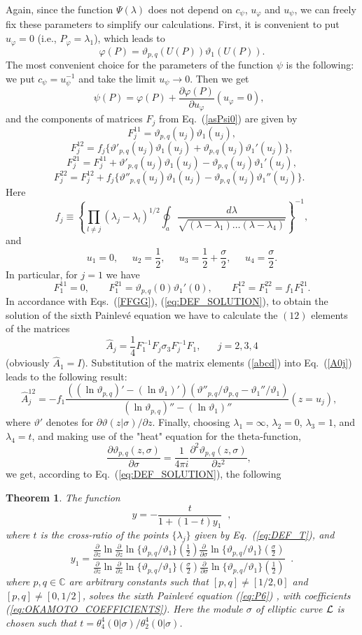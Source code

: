 \documentclass[11pt]{article}
\newtheorem{theorem}{Theorem}[section]
\def\be{\begin{equation}}
\def\ee{\end{equation}}
\def\ben{\begin{displaymath}}
\def\een{\end{displaymath}}
\def\l{\lambda}
\def\th{\vartheta}
\def\phi{\varphi}
\def\C{\mathbb{C}}
\def\la{\label}
\def\f{\frac}
\def\L{{\cal L}}
\def\p{\partial}
\def\log{\ln}
\begin{document}
Again, since the function $\Psi(\l)$ does not depend on $c_\psi$, $u_\phi$ and $u_\psi$, we can freely fix these parameters to simplify our calculations.
First, it is convenient to put $u_\phi=0$ (i.e., $P_\phi=\l_1$), which leads to
\be
\phi(P)=\th_{p,q}(U(P))\th_1(U(P)).
\ee
The most convenient choice for the parameters of the function $\psi$ is the following: we put $c_\psi=u_\psi^{-1}$ and take the limit $u_\psi\rightarrow 0$. Then we get  
\be
\psi(P)= \phi(P)+ \f{\p\phi(P)}{\p u_\phi}(u_\phi=0),\;\;
\la{psin}\ee
and the components of matrices $F_j$ from Eq.~(\ref{asPsi0}) are given by
\ben
F^{11}_j=\th_{p,q}(u_j)\th_1(u_j),
\een
\ben
F^{12}_j= f_j\{\th'_{p,q}(u_j)\th_1(u_j)+\th_{p,q}(u_j)\th_1'(u_j)\}, 
\een
\ben
F^{21}_j=F^{11}_j+\th'_{p,q}(u_j)\th_1(u_j)-\th_{p,q}(u_j)\th_1'(u_j),  
\een
\be
F^{22}_j=F^{12}_j+f_j\{\th''_{p,q}(u_j)\th_1(u_j)-\th_{p,q}(u_j)\th_1''(u_j)\}.\;\;
\la{abcd}
\ee
Here
\be
f_j\equiv
\left\{\prod_{l\neq j} (\l_j-\l_l)^{1/2}\oint_a\f{d\l}{\sqrt{(\l-\l_1)\dots (\l-\l_4)}}\right\}^{-1},
\la{Fj}\ee
and 
\be
u_1=0,\;\;\;\;\; u_2=\f{1}{2},\;\;\;\;\; u_3=\f{1}{2}+\f{\sigma}{2},\;\;\;\;\;
u_4=\f{\sigma}{2}.
\la{Uj1}\ee
In particular, for $j=1$ we have
\be
F^{11}_1=0,\;\;\;\;\;\;\;
F^{21}_1=\th_{p,q}(0)\th_1'(0),\;\;\;\;\;\;\;
F^{12}_1=F^{22}_1 =f_1 F^{21}_1.
\ee
In accordance with Eqs.~(\ref{FFGG}), (\ref{eq:DEF_SOLUTION}), to obtain the solution of the 
sixth Painlev\'{e} equation we have to calculate the $(12)$ elements of the matrices 
\be
\hat{A}_j= \f{1}{4}F_1^{-1}F_j\sigma_3 F_j^{-1} F_1,\;\;\;\;\;\; j=2,3,4
\la{A0j}\ee
(obviously $\hat{A}_1=I$). Substitution of the matrix elements (\ref{abcd})  into Eq.~(\ref{A0j}) 
leads to the following result:
\be
\hat{A}^{12}_j = -f_1
\f{((\log\th_{p,q})'-(\log\th_1)')
({\th''_{p,q}}/{\th_{p,q}}-{\th_1''}/{\th_1})}{(\log\th_{p,q})''-
(\log\th_1)''}(z=u_j),\;\;
\la{A12final}
\ee
where $\th'$ denotes for $\p\th(z|\sigma)/\p z$.
Finally, choosing $\l_1=\infty$, $\l_2=0$, $\l_3=1$, and $\l_4=t$, and making use of the "heat" equation for the theta-function,
\ben
\f{\p\th_{p,q}(z,\sigma)}{\p\sigma}=\f{1}{4\pi i}\f{\p^2\th_{p,q}(z,\sigma)}{\p z^2},\;\;
\een
we get, according to Eq.~(\ref{eq:DEF_SOLUTION}), the following 

\begin{theorem}
The function
\be
y=-\f{t}{1+(1-t) y_1}\;\;,
\la{y1}\ee 
where $t$ is the cross-ratio of the points $\{\l_j\}$ given by Eq.~{\rm(\ref{eq:DEF_T})}, and
\be
y_1=\f{\f{\p}{\p z}\log\f{\p}{\p z}\log\{\th_{p,q}/\th_1\}(\f{1}{2})
\f{\p}{\p \sigma}\log\{\th_{p,q}/\th_1\}(\f{\sigma}{2})}{\f{\p}{\p z}\log\f{\p}{\p z}\log\{\th_{p,q}/\th_1\}(\f{\sigma}{2})
\f{\p}{\p \sigma}\log\{\th_{p,q}/\th_1\}(\f{1}{2})}\;\;.
\la{solution}\ee
where $p,q\in\C$ are arbitrary constants such that $[p,q]\neq [1/2,0]$ and  
$[p,q]\neq [0,1/2]$,
solves the sixth Painlev\'e equation {\rm (\ref{eq:P6})} , with coefficients 
{\rm(\ref{eq:OKAMOTO_COEFFICIENTS})}. Here the module  $\sigma$ of elliptic curve $\L$ is chosen
such that $t=\theta_4^4(0|\sigma)/\theta_2^4(0|\sigma)$.
\end{theorem}
\end{document}
